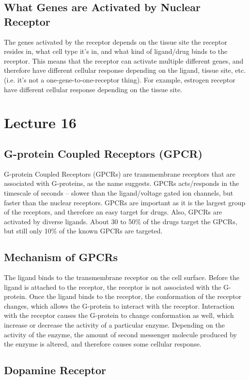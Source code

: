 \documentclass[a4paper, 12pt]{report}
\newcommand{\mychapter}[2]{
    \setcounter{chapter}{#1}
    \setcounter{section}{0}
    \chapter*{#2}
    \addcontentsline{toc}{chapter}{#2}
}
\begin{document}
\section{What Genes are Activated by Nuclear Receptor}

The genes activated by the receptor depends on the tissue site the receptor resides in, what cell type it's in, and what kind of ligand/drug binds to the receptor.
This means that the receptor can activate multiple different genes, and therefore have different cellular response depending on the ligand, tissue site, etc. (i.e. it's not a one-gene-to-one-receptor thing).
For example, estrogen receptor have different cellular response depending on the tissue site.

\mychapter{16}{Lecture 16}

\section{G-protein Coupled Receptors (GPCR)}

G-protein Coupled Receptors (GPCRs) are transmembrane receptors that are associated with G-proteins, as the name suggests.
GPCRs acts/responds in the timescale of seconds -- slower than the ligand/voltage gated ion channels, but faster than the nuclear receptors.
GPCRs are important as it is the largest group of the receptors, and therefore an easy target for drugs.
Also, GPCRs are activated by diverse ligands.
About 30 to 50\% of the drugs target the GPCRs, but still only 10\% of the known GPCRs are targeted.

\section{Mechanism of GPCRs}

The ligand binds to the transmembrane receptor on the cell surface.
Before the ligand is attached to the receptor, the receptor is not associated with the G-protein.
Once the ligand binds to the receptor, the conformation of the receptor changes, which allows the G-protein to interact with the receptor.
Interaction with the receptor causes the G-protein to change conformation as well, which increase or decrease the activity of a particular enzyme.
Depending on the activity of the enzyme, the amount of second messenger molecule produced by the enzyme is altered, and therefore causes some cellular response.

\section{Dopamine Receptor}
\end{document}

